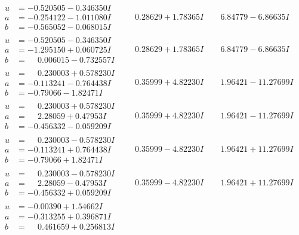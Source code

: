 \documentclass[1p]{elsarticle_modified}
\theoremstyle{definition}
\begin{document}
$$\begin{array}{c|c|c}
\begin{aligned}
u &= -0.520505 - 0.346350 I \\
a &= -0.254122 - 1.011080 I \\
b &= -0.565052 - 0.068015 I\end{aligned}
 & \phantom{-}0.28629 + 1.78365 I & \phantom{-}6.84779 - 6.86635 I \\ \hline\begin{aligned}
u &= -0.520505 - 0.346350 I \\
a &= -1.295150 + 0.060725 I \\
b &= \phantom{-}0.006015 - 0.732557 I\end{aligned}
 & \phantom{-}0.28629 + 1.78365 I & \phantom{-}6.84779 - 6.86635 I \\ \hline\begin{aligned}
u &= \phantom{-}0.230003 + 0.578230 I \\
a &= -0.113241 - 0.764438 I \\
b &= -0.79066 - 1.82471 I\end{aligned}
 & \phantom{-}0.35999 + 4.82230 I & \phantom{-}1.96421 - 11.27699 I \\ \hline\begin{aligned}
u &= \phantom{-}0.230003 + 0.578230 I \\
a &= \phantom{-}2.28059 + 0.47953 I \\
b &= -0.456332 - 0.059209 I\end{aligned}
 & \phantom{-}0.35999 + 4.82230 I & \phantom{-}1.96421 - 11.27699 I \\ \hline\begin{aligned}
u &= \phantom{-}0.230003 - 0.578230 I \\
a &= -0.113241 + 0.764438 I \\
b &= -0.79066 + 1.82471 I\end{aligned}
 & \phantom{-}0.35999 - 4.82230 I & \phantom{-}1.96421 + 11.27699 I \\ \hline\begin{aligned}
u &= \phantom{-}0.230003 - 0.578230 I \\
a &= \phantom{-}2.28059 - 0.47953 I \\
b &= -0.456332 + 0.059209 I\end{aligned}
 & \phantom{-}0.35999 - 4.82230 I & \phantom{-}1.96421 + 11.27699 I \\ \hline\begin{aligned}
u &= -0.00390 + 1.54662 I \\
a &= -0.313255 + 0.396871 I \\
b &= \phantom{-}0.461659 + 0.256813 I\end{aligned}

\end{array}$$
\end{document}
